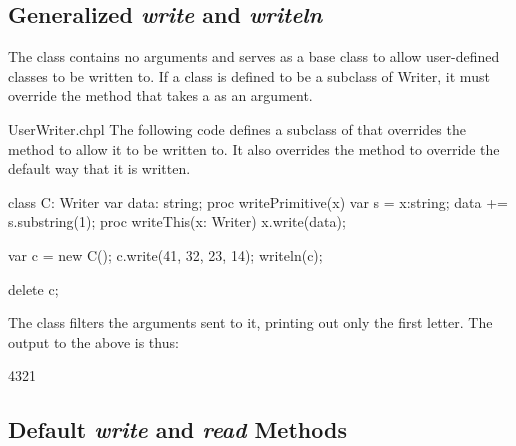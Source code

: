 \subsection{Generalized {\em write} and {\em writeln}}
\label{writer}

The  class contains no arguments and serves as a base
class to allow user-defined classes to be written to.  If a class is
defined to be a subclass of Writer, it must override
the  method that takes a  as an argument.

\begin{chapelexample}{UserWriter.chpl}
The following code defines a subclass of  that overrides
the  method to allow it to be written to.  It also
overrides the  method to override the default way that
it is written.
\begin{chapel}
class C: Writer {
  var data: string;
  proc writePrimitive(x) {
    var s = x:string;
    data += s.substring(1);
  }
  proc writeThis(x: Writer) {
    x.write(data);
  }
}

var c = new C();
c.write(41, 32, 23, 14);
writeln(c);
\end{chapel}
\begin{chapelpost}
delete c;
\end{chapelpost}
The  class filters the arguments sent to it, printing out only
the first letter.  The output to the above is thus:
\begin{chapelprintoutput}{}
4321
\end{chapelprintoutput}
\end{chapelexample}






\subsection{Default {\em write} and {\em read} Methods}

